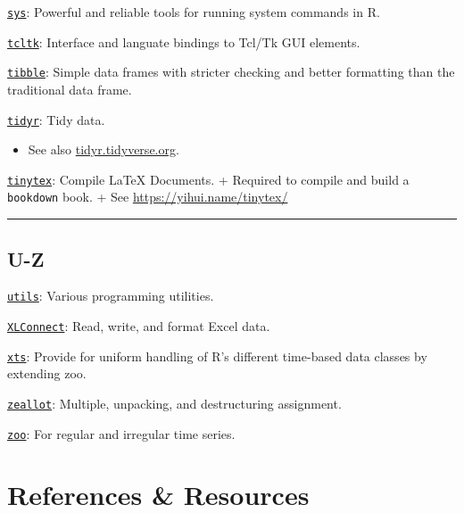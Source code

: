 \documentclass[
]{book}
\providecommand{\tightlist}{%
  \setlength{\itemsep}{0pt}\setlength{\parskip}{0pt}}
\begin{document}
\href{https://CRAN.R-project.org/package=sys}{\texttt{sys}}: Powerful and reliable tools for running system commands in R.

\href{https://www.rdocumentation.org/packages/tcltk/versions/3.5.2}{\texttt{tcltk}}: Interface and languate bindings to Tcl/Tk GUI elements.

\href{https://CRAN.R-project.org/package=tibble}{\texttt{tibble}}: Simple data frames with stricter checking and better formatting than the traditional data frame.

\href{https://CRAN.R-project.org/package=tidyr}{\texttt{tidyr}}: Tidy data.

\begin{itemize}
\tightlist
\item
  See also \href{https://tidyr.tidyverse.org/}{tidyr.tidyverse.org}.
\end{itemize}

\href{https://CRAN.R-project.org/package=tinytex}{\texttt{tinytex}}: Compile LaTeX Documents.
+ Required to compile and build a \texttt{bookdown} book.
+ See \url{https://yihui.name/tinytex/}

\begin{center}\rule{0.5\linewidth}{0.5pt}\end{center}

\hypertarget{u-z}{%
\section{U-Z}\label{u-z}}

\href{https://CRAN.R-project.org/package=R.utils}{\texttt{utils}}: Various programming utilities.

\href{https://CRAN.R-project.org/package=XLConnect}{\texttt{XLConnect}}: Read, write, and format Excel data.

\href{https://CRAN.R-project.org/package=xts}{\texttt{xts}}: Provide for uniform handling of R's different time-based data classes by extending zoo.

\href{https://CRAN.R-project.org/package=zeallot}{\texttt{zeallot}}: Multiple, unpacking, and destructuring assignment.

\href{https://CRAN.R-project.org/package=zoo}{\texttt{zoo}}: For regular and irregular time series.

\hypertarget{references-resources}{%
\chapter{References \& Resources}\label{references-resources}}
\end{document}
